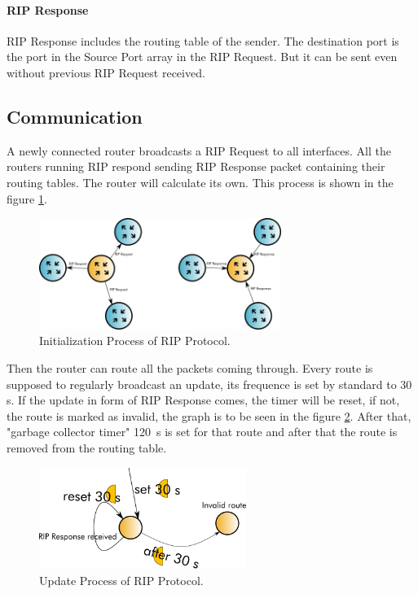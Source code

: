 \documentclass[10pt,a4paper,titlepage]{article}
\begin{document}
            \paragraph{RIP Response} 
                RIP Response includes the routing table of the sender. The destination port is the port in the Source Port
                array in the RIP Request. But it can be sent even without previous RIP Request received.


        \subsection{Communication}
            A newly connected router broadcasts a RIP Request to all interfaces. All the routers running RIP
            respond sending RIP Response packet containing their routing tables. The router will calculate its own.
            This process is shown in the figure \ref{fig:RIPstart}.

            \begin{figure}[h!]
                \begin{center}
                    \includegraphics[width=0.70\textwidth]{RIPstart.png}
                    \caption{Initialization Process of RIP Protocol. \label{fig:RIPstart}}
                \end{center}
            \end{figure}

            Then the router can route all the packets coming through. Every route is supposed to regularly broadcast an update,
            its frequence is set by standard to 30 s. If the update in form of RIP Response comes, the timer will be reset, if not,
            the route is marked as invalid, the graph is to be seen in the figure \ref{fig:RIPupdate}. After that, "garbage collector timer"
            120~s is set for that route and after that the route is removed from the routing table. 

            \begin{figure}[h!]
                \begin{center}
                    \includegraphics[width=0.60\textwidth]{RIPupdate.png}
                    \caption{Update Process of RIP Protocol. \label{fig:RIPupdate}}
                \end{center}
            \end{figure}
\end{document}
